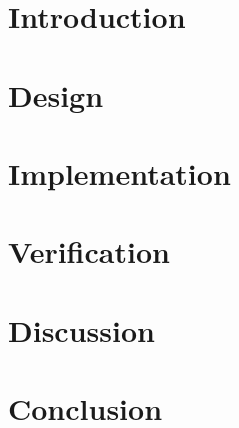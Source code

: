 \documentclass[titlepage,12pt,a4paper]{article}
\begin{document}


\newpage
\tableofcontents
\listoffigures
\listoftables

\newpage
{}

\section{Introduction}

\newpage
\section{Design}

\newpage
\section{Implementation}

\newpage
\section{Verification}

\newpage
\section{Discussion}

\newpage
\section{Conclusion}

\newpage

\appendix


\end{document}
